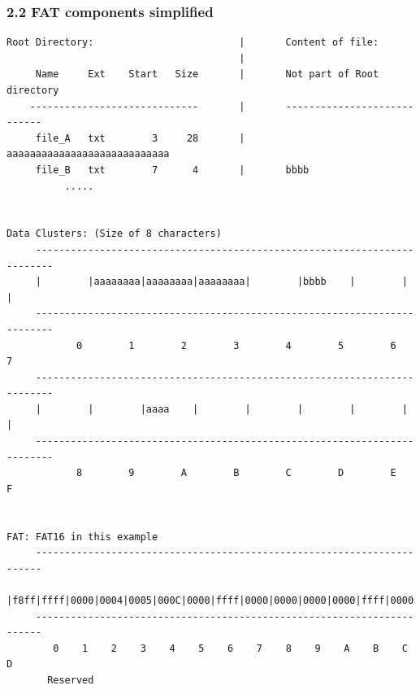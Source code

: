 \begin{frame}[fragile]
  \frametitle{2.2 FAT components simplified}
  \begin{lstlisting}[basicstyle=\tiny]
Root Directory:                         |       Content of file:  
                                        |                                  
     Name     Ext    Start   Size       |       Not part of Root directory
    -----------------------------       |       ----------------------------
     file_A   txt        3     28       |       aaaaaaaaaaaaaaaaaaaaaaaaaaaa
     file_B   txt        7      4       |       bbbb
          .....                                                             
                                                                             
                                                                             
Data Clusters: (Size of 8 characters)
     -------------------------------------------------------------------------
     |        |aaaaaaaa|aaaaaaaa|aaaaaaaa|        |bbbb    |        |        |
     -------------------------------------------------------------------------
            0        1        2        3        4        5        6        7  
     -------------------------------------------------------------------------
     |        |        |aaaa    |        |        |        |        |        |
     -------------------------------------------------------------------------
            8        9        A        B        C        D        E        F

  
FAT: FAT16 in this example                                                 
     -----------------------------------------------------------------------
     |f8ff|ffff|0000|0004|0005|000C|0000|ffff|0000|0000|0000|0000|ffff|0000|
     -----------------------------------------------------------------------
        0    1    2    3    4    5    6    7    8    9    A    B    C    D
       Reserved 
  \end{lstlisting}
\end{frame}


